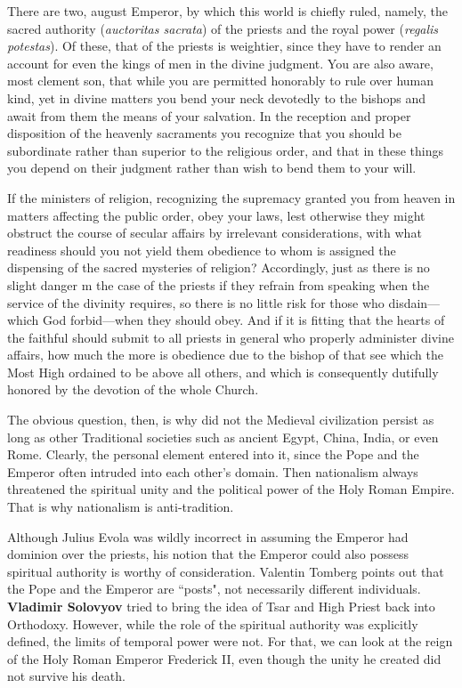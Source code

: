 \begin{quotex}
There are two, august Emperor, by which this world is chiefly ruled, namely, the sacred authority (\emph{auctoritas sacrata}) of the priests and the royal power (\emph{regalis potestas}). Of these, that of the priests is weightier, since they have to render an account for even the kings of men in the divine judgment. You are also aware, most clement son, that while you are permitted honorably to rule over human kind, yet in divine matters you bend your neck devotedly to the bishops and await from them the means of your salvation. In the reception and proper disposition of the heavenly sacraments you recognize that you should be subordinate rather than superior to the religious order, and that in these things you depend on their judgment rather than wish to bend them to your will.

If the ministers of religion, recognizing the supremacy granted you from heaven in matters affecting the public order, obey your laws, lest otherwise they might obstruct the course of secular affairs by irrelevant considerations, with what readiness should you not yield them obedience to whom is assigned the dispensing of the sacred mysteries of religion? Accordingly, just as there is no slight danger m the case of the priests if they refrain from speaking when the service of the divinity requires, so there is no little risk for those who disdain—which God forbid—when they should obey. And if it is fitting that the hearts of the faithful should submit to all priests in general who properly administer divine affairs, how much the more is obedience due to the bishop of that see which the Most High ordained to be above all others, and which is consequently dutifully honored by the devotion of the whole Church. 

\end{quotex}
The obvious question, then, is why did not the Medieval civilization persist as long as other Traditional societies such as ancient Egypt, China, India, or even Rome. Clearly, the personal element entered into it, since the Pope and the Emperor often intruded into each other's domain. Then nationalism always threatened the spiritual unity and the political power of the Holy Roman Empire. That is why nationalism is anti-tradition.

Although Julius Evola was wildly incorrect in assuming the Emperor had dominion over the priests, his notion that the Emperor could also possess spiritual authority is worthy of consideration. Valentin Tomberg points out that the Pope and the Emperor are ``posts", not necessarily different individuals. \textbf{Vladimir Solovyov} tried to bring the idea of Tsar and High Priest back into Orthodoxy. However, while the role of the spiritual authority was explicitly defined, the limits of temporal power were not. For that, we can look at the reign of the Holy Roman Emperor Frederick II, even though the unity he created did not survive his death.

